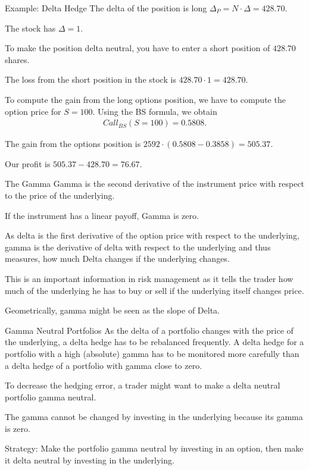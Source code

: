 Example: Delta Hedge
	The delta of the position is long $\Delta_P=N\cdot \Delta=428.70$.
   
	The stock has $\Delta=1$.
  
	To make the position delta neutral, you have to enter a short position
  of $428.70$ shares.

	The loss from the short position in the stock is $428.70 \cdot
  1=428.70$.
  
	To compute the gain from the long options position, we have to compute
  the option price for $S=100$. Using the BS formula, we obtain
		\begin{align*}
			Call_{BS}(S=100) = 0.5808.
		\end{align*}
	
	The gain from the options position is $2592\cdot(0.5808-0.3858)=505.37$.
  
	Our profit is $505.37-428.70=76.67$.


The Gamma
	Gamma is the second derivative of the instrument price with respect to
	the price of the underlying.
   
	If the instrument has a linear payoff, Gamma is zero.
   
	As delta is the first derivative of the option price with respect to the
  underlying, gamma is the derivative of delta with respect to the underlying
  and thus measures, how much Delta changes if the underlying changes.
   
	This is an important information in risk management as it tells the
  trader how much of the underlying he has to buy or sell if the underlying
  itself changes price.
   
	Geometrically, gamma might be seen as the slope of Delta.


Gamma Neutral Portfolios
	As the delta of a portfolio changes with the price of the underlying, a delta
	hedge has to be rebalanced frequently. 
		A delta hedge for a portfolio with a high (absolute) gamma has to be
		monitored more carefully than a delta hedge of a portfolio with gamma close to
		zero.
		
		To decrease the hedging error, a trader might want to make a delta
		neutral portfolio gamma neutral.
		
		The gamma cannot be changed by investing in the underlying because its
		gamma is zero.
		
		Strategy: Make the portfolio gamma neutral by investing in an option,
		then make it delta neutral by investing in the underlying.


